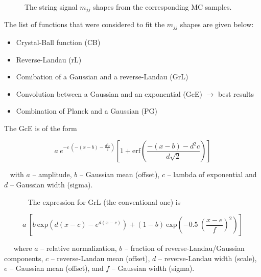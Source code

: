 \begin{figure}[!htb]
  \caption{The string signal $m_{jj}$ shapes from the corresponding MC samples.}
  \label{fig:InitStrmjj}
\end{figure}



The list of functions that were considered to fit the $m_{jj}$ shapes are given below:

\begin{itemize}
    \item Crystal-Ball function (CB)
    \item Reverse-Landau (rL) 
    \item Comibation of a Gaussian and a reverse-Landau (GrL) 
    \item Convolution between a Gaussian and an exponential (GcE) $\rightarrow$ best results
    \item Combination of Planck and a Gaussian (PG) 
\end{itemize}   

The GcE is of the form

\begin{equation}
a~e^{-c~(-(x-b)-\frac{d^{2}c}{2})}[1+\mathrm{erf}(\frac{-(x-b)-d^{2}c}{d\sqrt{2}})]
\end{equation}

~ with $a$ -- amplitude, $b$ -- Gaussian mean (offset), $c$ -- lambda of exponential and $d$ -- Gaussian width (sigma).

~~~~~~ The expression for GrL (the conventional one) is 

\begin{equation} 
a ~[b ~ \mathrm{exp}(d(x-c)-e^{d(x-c)}) + (1-b) ~ \mathrm{exp}(-0.5 ~ (\frac{x-e}{f})^{2})] 
\end{equation}

~~ where $a$ -- relative normalization, $b$ -- fraction of reverse-Landau/Gaussian components, $c$ -- reverse-Landau mean (offset), $d$ -- reverse-Landau width (scale), $e$ -- Gaussian mean (offset), and $f$ -- Gaussian width (sigma).


